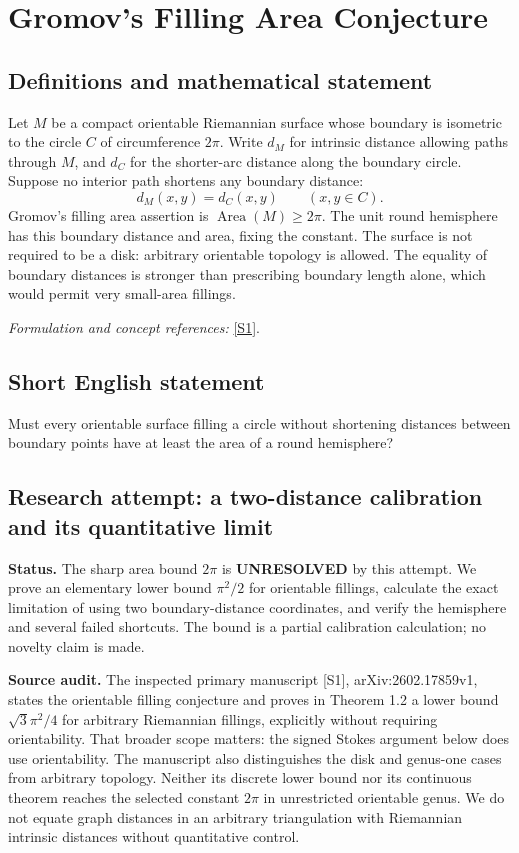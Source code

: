 \documentclass[11pt]{article}
\begin{document}
\section*{\texorpdfstring{Gromov's Filling Area Conjecture}{Gromov's Filling Area Conjecture}}\label{384}
\subsection{Definitions and mathematical statement}
Let $M$ be a compact orientable Riemannian surface whose boundary is isometric to the circle $C$ of circumference $2\pi$. Write $d_M$ for intrinsic distance allowing paths through $M$, and $d_C$ for the shorter-arc distance along the boundary circle. Suppose no interior path shortens any boundary distance:
\[
 d_M(x,y)=d_C(x,y)\qquad(x,y\in C).
\]
Gromov's filling area assertion is $\operatorname{Area}(M)\ge2\pi$. The unit round hemisphere has this boundary distance and area, fixing the constant. The surface is not required to be a disk: arbitrary orientable topology is allowed. The equality of boundary distances is stronger than prescribing boundary length alone, which would permit very small-area fillings.
\par\smallskip\textit{Formulation and concept references:} \href{https://arxiv.org/abs/2602.17859}{[S1]}.

\subsection{Short English statement}
Must every orientable surface filling a circle without shortening distances between boundary points have at least the area of a round hemisphere?
\subsection{Research attempt: a two-distance calibration and its quantitative limit}
\textbf{Status.} The sharp area bound $2\pi$ is \textbf{UNRESOLVED} by this attempt. We prove an elementary lower bound $\pi^2/2$ for orientable fillings, calculate the exact limitation of using two boundary-distance coordinates, and verify the hemisphere and several failed shortcuts. The bound is a partial calibration calculation; no novelty claim is made.

\textbf{Source audit.} The inspected primary manuscript [S1], arXiv:2602.17859v1, states the orientable filling conjecture and proves in Theorem 1.2 a lower bound $\sqrt3\pi^2/4$ for arbitrary Riemannian fillings, explicitly without requiring orientability. That broader scope matters: the signed Stokes argument below does use orientability. The manuscript also distinguishes the disk and genus-one cases from arbitrary topology. Neither its discrete lower bound nor its continuous theorem reaches the selected constant $2\pi$ in unrestricted orientable genus. We do not equate graph distances in an arbitrary triangulation with Riemannian intrinsic distances without quantitative control.
\end{document}
